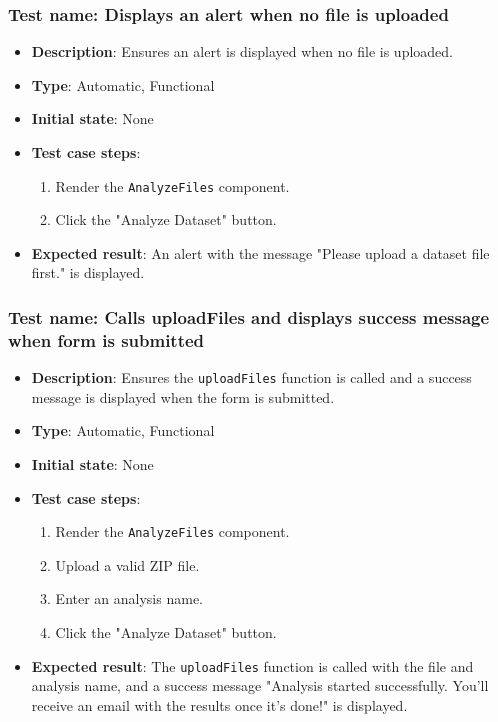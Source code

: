 \documentclass[12pt, titlepage]{article}
\begin{document}
\subsubsection{Test name: Displays an alert when no file is uploaded}
\begin{itemize}
    \item \textbf{Description}: Ensures an alert is displayed when no file is uploaded.
    \item \textbf{Type}: Automatic, Functional
    \item \textbf{Initial state}: None
    \item \textbf{Test case steps}:
    \begin{enumerate}
        \item Render the \texttt{AnalyzeFiles} component.
        \item Click the "Analyze Dataset" button.
    \end{enumerate}
    \item \textbf{Expected result}: An alert with the message "Please upload a dataset file first." is displayed.
\end{itemize}

\subsubsection{Test name: Calls uploadFiles and displays success message when form is submitted}
\begin{itemize}
    \item \textbf{Description}: Ensures the \texttt{uploadFiles} function is called and a success message is displayed when the form is submitted.
    \item \textbf{Type}: Automatic, Functional
    \item \textbf{Initial state}: None
    \item \textbf{Test case steps}:
    \begin{enumerate}
        \item Render the \texttt{AnalyzeFiles} component.
        \item Upload a valid ZIP file.
        \item Enter an analysis name.
        \item Click the "Analyze Dataset" button.
    \end{enumerate}
    \item \textbf{Expected result}: The \texttt{uploadFiles} function is called with the file and analysis name, and a success message "Analysis started successfully. You'll receive an email with the results once it's done!" is displayed.
\end{itemize}
\end{document}
